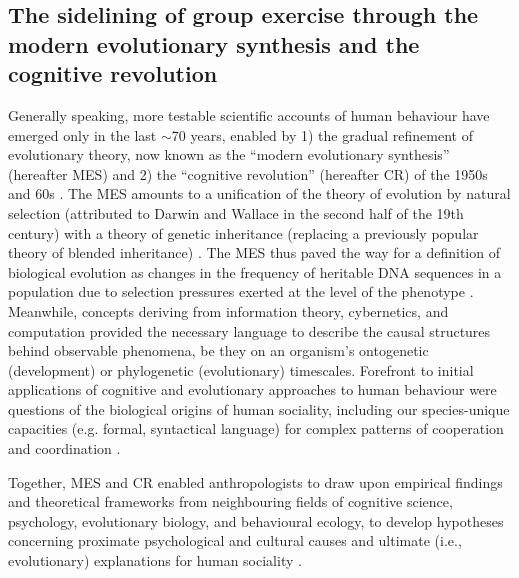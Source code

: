 \begin{CJK}{UTF8}{gbsn}
\subsection{The sidelining of group exercise through the modern evolutionary synthesis and the cognitive revolution}

Generally speaking, more testable scientific accounts of human behaviour have emerged only in the last $\sim$70 years,  enabled by 1) the gradual refinement of evolutionary theory, now known as the ``modern evolutionary synthesis'' (hereafter MES) and 2) the ``cognitive revolution'' (hereafter CR) of the 1950s and 60s \citep{Laland2010}.  The MES amounts to a unification of the theory of evolution by natural selection (attributed to Darwin and Wallace in the second half of the 19th century) with a theory of genetic inheritance (replacing a previously popular theory of blended inheritance) \citep{Calcott2013}.  The MES thus paved the way for a definition of biological evolution as changes in the frequency of heritable DNA sequences in a population due to selection pressures exerted at the level of the phenotype \citep{Grafen1984}.  Meanwhile, concepts deriving from information theory, cybernetics, and computation provided the necessary language to describe the causal structures behind observable phenomena, be they on an organism's ontogenetic (development) or phylogenetic (evolutionary) timescales.  Forefront to initial applications of cognitive and evolutionary approaches to human behaviour were questions of the biological origins of human sociality, including our species-unique capacities (e.g. formal, syntactical language) for complex patterns of cooperation and coordination \citep{Wilson1975,Chomsky1965}.

Together, MES and CR enabled anthropologists to draw upon empirical findings and theoretical frameworks from neighbouring fields of cognitive science, psychology, evolutionary biology, and behavioural ecology, to develop hypotheses concerning proximate psychological and cultural causes and ultimate (i.e., evolutionary) explanations for human sociality \cite[e.g.][see Appendix ~\ref{app1:intro} Section ~\ref{sect:modernSynthesis} for a more detailed explanation of MS, CR, and their applications to human behaviour)]{Dawkins1976,Wilson1978,Sperber1996,Whitehouse2004,Dunbar1996}.


\end{CJK}
